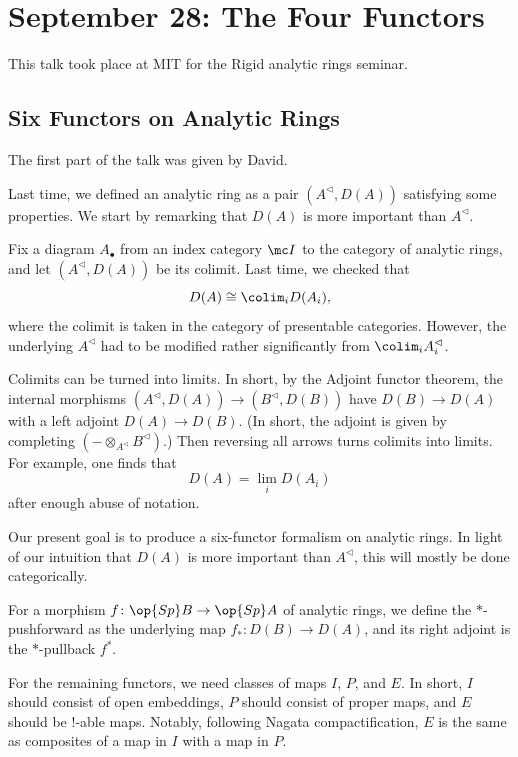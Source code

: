 \documentclass{article}
\begin{document}
\section{September 28: The Four Functors}
This talk took place at MIT for the Rigid analytic rings seminar.

\subsection{Six Functors on Analytic Rings}
The first part of the talk was given by David.

Last time, we defined an analytic ring as a pair $(A^\vartriangleleft,D(A))$ satisfying some properties. We start by remarking that $D(A)$ is more important than $A^\vartriangleleft$.
\begin{example}
	Fix a diagram $A_\bullet$ from an index category $\mc I$ to the category of analytic rings, and let $(A^\vartriangleleft,D(A))$ be its colimit. Last time, we checked that
	\[D(A)\cong\colim_iD(A_i),\]
	where the colimit is taken in the category of presentable categories. However, the underlying $A^\vartriangleleft$ had to be modified rather significantly from $\colim_iA_i^\vartriangleleft$. 
\end{example}
\begin{remark}
	Colimits can be turned into limits. In short, by the Adjoint functor theorem, the internal morphisms $(A^\vartriangleleft,D(A))\to(B^\vartriangleleft,D(B))$ have $D(B)\to D(A)$ with a left adjoint $D(A)\to D(B)$. (In short, the adjoint is given by completing $(-\otimes_{A^\vartriangleleft}B^\vartriangleleft)$.) Then reversing all arrows turns colimits into limits. For example, one finds that
	\[D(A)=\lim_iD(A_i)\]
	after enough abuse of notation.
\end{remark}
Our present goal is to produce a six-functor formalism on analytic rings. In light of our intuition that $D(A)$ is more important than $A^\vartriangleleft$, this will mostly be done categorically.
\begin{definition}
	For a morphism $f\colon\op{Sp}B\to\op{Sp}A$ of analytic rings, we define the $*$-pushforward as the underlying map $f_*\colon D(B)\to D(A)$, and its right adjoint is the $*$-pullback $f^*$.
\end{definition}
For the remaining functors, we need classes of maps $I$, $P$, and $E$. In short, $I$ should consist of open embeddings, $P$ should consist of proper maps, and $E$ should be $!$-able maps. Notably, following Nagata compactification, $E$ is the same as composites of a map in $I$ with a map in $P$.
\end{document}
